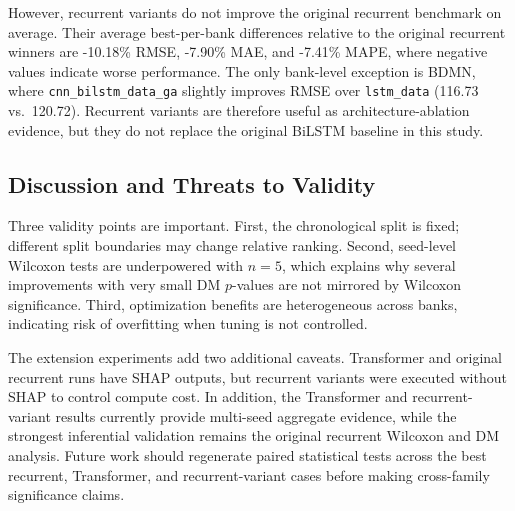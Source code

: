 However, recurrent variants do not improve the original recurrent benchmark on average. Their average best-per-bank differences relative to the original recurrent winners are -10.18\% RMSE, -7.90\% MAE, and -7.41\% MAPE, where negative values indicate worse performance. The only bank-level exception is BDMN, where \texttt{cnn\_bilstm\_data\_ga} slightly improves RMSE over \texttt{lstm\_data} (116.73 vs.\ 120.72). Recurrent variants are therefore useful as architecture-ablation evidence, but they do not replace the original BiLSTM baseline in this study.

\subsection{Discussion and Threats to Validity}
Three validity points are important. First, the chronological split is fixed; different split boundaries may change relative ranking. Second, seed-level Wilcoxon tests are underpowered with $n=5$, which explains why several improvements with very small DM $p$-values are not mirrored by Wilcoxon significance. Third, optimization benefits are heterogeneous across banks, indicating risk of overfitting when tuning is not controlled.

The extension experiments add two additional caveats. Transformer and original recurrent runs have SHAP outputs, but recurrent variants were executed without SHAP to control compute cost. In addition, the Transformer and recurrent-variant results currently provide multi-seed aggregate evidence, while the strongest inferential validation remains the original recurrent Wilcoxon and DM analysis. Future work should regenerate paired statistical tests across the best recurrent, Transformer, and recurrent-variant cases before making cross-family significance claims.
